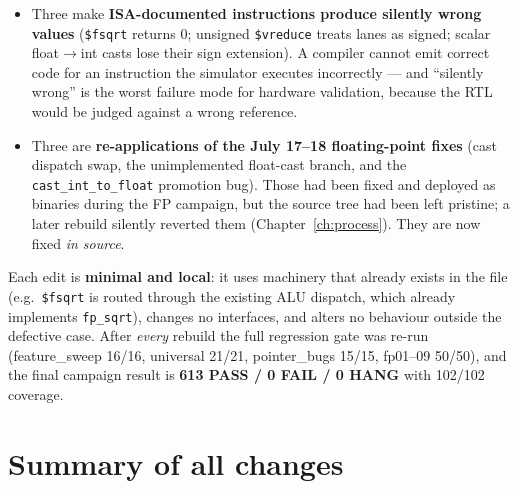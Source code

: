 \documentclass[11pt,a4paper]{report}
\begin{document}
\begin{itemize}[itemsep=2pt]
  \item Three make \textbf{ISA-documented instructions produce silently wrong
        values} (\texttt{\$fsqrt} returns 0; unsigned \texttt{\$vreduce}
        treats lanes as signed; scalar float$\to$int casts lose their sign
        extension). A compiler cannot emit correct code for an instruction the
        simulator executes incorrectly --- and ``silently wrong'' is the worst
        failure mode for hardware validation, because the RTL would be judged
        against a wrong reference.
  \item Three are \textbf{re-applications of the July 17--18 floating-point
        fixes} (cast dispatch swap, the unimplemented float-cast branch, and
        the \texttt{cast\_int\_to\_float} promotion bug). Those had been fixed
        and deployed as binaries during the FP campaign, but the source tree
        had been left pristine; a later rebuild silently reverted them
        (Chapter~\ref{ch:process}). They are now fixed \emph{in source}.
\end{itemize}

Each edit is \textbf{minimal and local}: it uses machinery that already exists
in the file (e.g.\ \texttt{\$fsqrt} is routed through the existing ALU
dispatch, which already implements \texttt{fp\_sqrt}), changes no interfaces,
and alters no behaviour outside the defective case. After \emph{every} rebuild
the full regression gate was re-run (feature\_sweep 16/16, universal 21/21,
pointer\_bugs 15/15, fp01--09 50/50), and the final campaign result is
\textbf{613 PASS / 0 FAIL / 0 HANG} with 102/102 coverage.

\section{Summary of all changes}
\end{document}

